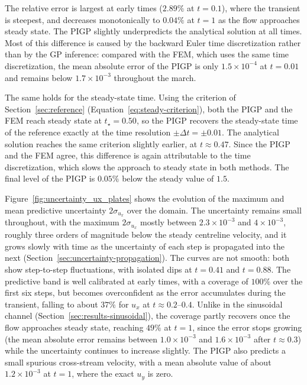 \documentclass[11pt, a4paper]{report}
\begin{document}
The relative error is largest at early times (\(2.89\%\) at \(t=0.1\)), where the
transient is steepest, and decreases monotonically to \(0.04\%\) at \(t=1\) as the flow
approaches steady state. The PIGP slightly underpredicts the analytical solution at
all times. Most of this difference is caused by the backward Euler time
discretization rather than by the GP inference: compared with the FEM, which uses the
same time discretization, the mean absolute error of the PIGP is only
\(1.5\times10^{-4}\) at \(t=0.01\) and remains below \(1.7\times10^{-3}\) throughout
the march.

The same holds for the steady-state time. Using the criterion of
Section~\ref{sec:reference} (Equation~\eqref{eq:steady-criterion}), both the PIGP and
the FEM reach steady state at \(t_\star = 0.50\), so the PIGP recovers the
steady-state time of the reference exactly at the time resolution
\(\pm\Delta t = \pm 0.01\). The analytical solution reaches the same criterion slightly
earlier, at \(t \approx 0.47\). Since the PIGP and the FEM agree, this difference is
again attributable to the time discretization, which slows the approach to steady
state in both methods. The final level of the PIGP is \(0.05\%\) below the steady
value of \(1.5\).

Figure~\ref{fig:uncertainty_ux_plates} shows the evolution of the maximum and mean
predictive uncertainty \(2\sigma_{u_x}\) over the domain. The uncertainty remains
small throughout, with the maximum \(2\sigma_{u_x}\) mostly between
\(2.3\times10^{-3}\) and \(4\times10^{-3}\), roughly three orders of magnitude below
the steady centreline velocity, and it grows slowly with time as the uncertainty of
each step is propagated into the next (Section~\ref{sec:uncertainty-propagation}). The
curves are not smooth: both show step-to-step fluctuations, with isolated dips at
\(t = 0.41\) and \(t = 0.88\). The predictive band is well calibrated at early times,
with a coverage of \(100\%\) over the first six steps, but becomes overconfident as
the error accumulates during the transient, falling to about \(37\%\) for \(u_x\) at
\(t \approx 0.2\)--\(0.4\). Unlike in the sinusoidal channel
(Section~\ref{sec:results-sinusoidal}), the coverage partly recovers once the flow
approaches steady state, reaching \(49\%\) at \(t=1\), since the error stops growing
(the mean absolute error remains between \(1.0\times10^{-3}\) and
\(1.6\times10^{-3}\) after \(t \approx 0.3\)) while the uncertainty continues to
increase slightly. The PIGP also predicts a small spurious cross-stream velocity, with
a mean absolute value of about \(1.2\times10^{-3}\) at \(t=1\), where the exact
\(u_y\) is zero.
\end{document}
